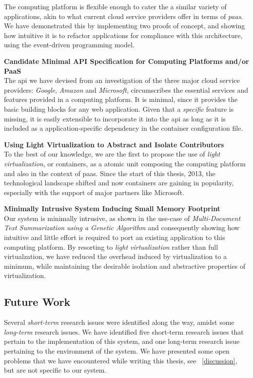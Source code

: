 \documentclass[12pt, titlepage]{uo_temp}
\begin{document}
     The computing platform is flexible enough to cater the a similar variety of
     applications, akin to what current cloud service providers offer in terms of
     \emph{paas}. We have demonstrated this by implementing two proofs of concept, and
     showing how intuitive it is to refactor applications for compliance with this
     architecture, using the event-driven programming model.

     \textbf{Candidate Minimal API Specification for Computing Platforms and/or PaaS}\\
     The \gls{api} we have devised from an investigation of the three major cloud service
     providers: \emph{Google}, \emph{Amazon} and \emph{Microsoft}, circumscribes the
     essential services and features provided in a computing platform. It is minimal,
     since it provides the basic building blocks for any web application. Given that a
     \emph{specific} feature is missing, it is easily extensible to incorporate it into
     the \gls{api} as long as it is included as a application-specific dependency in the
     container configuration file. 

     \textbf{Using Light Virtualization to Abstract and Isolate Contributors}\\
     To the best of our knowledge, we are the first to propose the use of \emph{light
       virtualization}, or containers, as a atomic unit composing the computing
     platform and also in the context of \gls{paas}. Since the start of this thesis, 2013,
     the technological landscape shifted and now containers are gaining in popularity,
     especially with the support of major partners like Microsoft.
     
     \textbf{Minimally Intrusive System Inducing Small Memory Footprint}\\
     Our system is minimally intrusive, as shown in the use-case of \emph{Multi-Document Text
     Summarization using a Genetic Algorithm} and consequently showing how intuitive and
     little effort is required to port an existing application to this computing
     platform. By resorting to \emph{light virtualization} rather than full virtualzation,
     we have reduced the overhead induced by virtualization to a minimum, while
     maintaining the desirable isolation and abstractive properties of virtualization.

     \subsection{Future Work}
     Several \emph{short-term} research issues were identified along the way, amidst some
     \emph{long-term} research issues. We have identified five short-term research issues
     that pertain to the implementation of this system, and one long-term research issue
     pertaining to the environment of the system. We have presented some open problems
     that we have encountered while writing this thesis, see ~\ref{discussion}, but are
     not specific to our system. 
\end{document}
